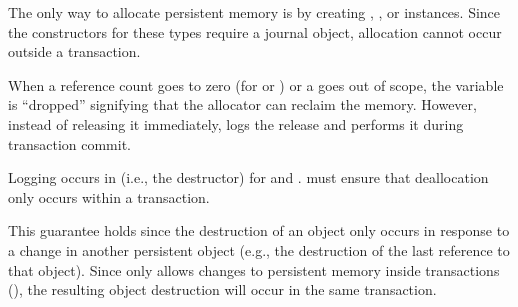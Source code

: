  The only way to allocate persistent memory is by
creating , , or  instances.  Since the
constructors for these types require a journal object, allocation cannot
occur outside a transaction.


 When a reference count goes to zero (for
 or ) or a  goes out of scope, the variable is
``dropped'' signifying that the allocator can reclaim the memory.  However,
instead of releasing it immediately, \this{} logs the release and performs it
during transaction commit.

Logging occurs in  (i.e., the destructor) for
  and .  \This{} must ensure that
deallocation only occurs within a transaction.

This guarantee holds since the destruction of an object only occurs in response to a change in another
persistent object (e.g., the destruction of the last reference to that
object).  Since \this{} only allows changes to persistent memory inside
transactions (), the resulting object
destruction will occur in the same transaction.


